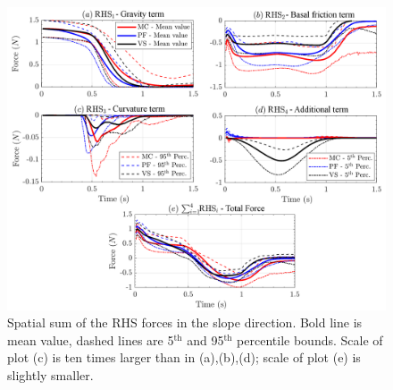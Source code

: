 \documentclass{article}
\begin{document}
\begin{figure}[H]
        \centering
        \includegraphics[width=1\textwidth]{InclinedPlane/AveragedMeasurments/ForcesIncline.png}
        \caption{Spatial sum of the RHS forces in the slope direction. Bold line is mean value, dashed lines are 5$^{\mathrm{th}}$ and 95$^{\mathrm{th}}$ percentile bounds. Scale of plot (c) is ten times larger than in (a),(b),(d); scale of plot (e) is slightly smaller.}
        \label{fig:Ramp-Fx-spatial}
\end{figure}
\end{document}
